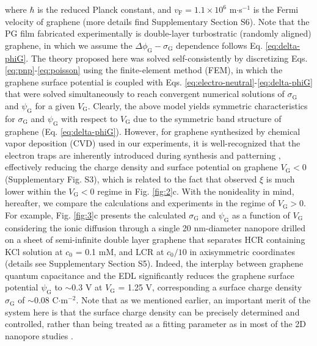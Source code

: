 \documentclass[journal=langd5,email=true, hyperref=true, keywords=false]{achemso}
\newcommand{\Fig}{Fig.}
\begin{document}
where $\hbar$ is the reduced Planck constant, and
$v_{\mathrm{F}}=1.1\times10^{6}$ m$\cdot$s$^{-1}$ is the Fermi
velocity of graphene (more details find Supplementary Section S6).
Note that the PG film fabricated experimentally is double-layer
turbostratic (randomly aligned) graphene, in which we assume the
$\Delta \phi_{\mathrm{G}} - \sigma_{\mathrm{G}}$ dependence follows
Eq. \eqref{eq:delta-phiG}. The theory proposed here was solved
self-consistently by discretizing
Eqs. \eqref{eq:pnp}-\eqref{eq:poisson} using the finite-element method
(FEM), in which the graphene surface potential is coupled with
Eqs. \eqref{eq:electro-neutral}-\eqref{eq:delta-phiG} that were solved
simultaneously to reach convergent numerical solutions of
$\sigma_{\mathrm{G}}$ and $\psi_{\mathrm{G}}$ for a given
$V_{\mathrm{G}}$. Clearly, the above model yields symmetric
characteristics for $\sigma_{\mathrm{G}}$ and $\psi_{\mathrm{G}}$ with
respect to $V_{\mathrm{G}}$ due to the symmetric band structure of
graphene (Eq. \eqref{eq:delta-phiG}). However, for graphene
synthesized by chemical vapor deposition (CVD) used in our
experiments, it is well-recognized that the electron traps are
inherently introduced during synthesis and patterning
\cite{Dean_2010}, effectively reducing the charge density and surface
potential on graphene $V_{\mathrm{G}}<0$ (Supplementary \Fig{} S3),
which is related to the fact that observed $\xi$ is much lower within
the $V_{\mathrm{G}}<0$ regime in \Fig{} \ref{fig:2}c. With the
nonideality in mind, hereafter, we compare the calculations and
experiments in the regime of $V_{\mathrm{G}}>0$. For example, \Fig{}
\ref{fig:3}c presents the calculated $\sigma_{\mathrm{G}}$ and
$\psi_{\mathrm{G}}$ as a function of $V_{\mathrm{G}}$ considering the
ionic diffusion through a single 20 nm-diameter nanopore drilled on a
sheet of semi-infinite double layer graphene that separates HCR
containing KCl solution at $c_{0}$ = 0.1 mM, and LCR at $c_{0}/10$ in
axisymmetric coordinates (details see Supplementary Section
S5). Indeed, the interplay between graphene quantum capacitance and
the EDL significantly reduces the graphene surface potential
$\psi_{\mathrm{G}}$ to $\sim$0.3 V at $V_{\mathrm{G}}$ = 1.25 V,
corresponding a surface charge density $\sigma_{\mathrm{G}}$ of
$\sim$0.08 C$\cdot$m$^{-2}$. Note that as we mentioned earlier, an
important merit of the system here is that the surface charge density
can be precisely determined and controlled, rather than being treated
as a fitting parameter as in most of the 2D nanopore studies
\cite{Rollings_2016}.
\end{document}
